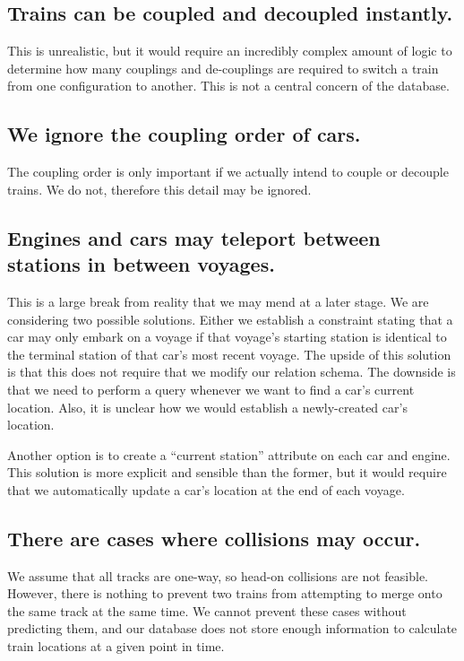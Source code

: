 \documentclass[a4paper]{article}
\begin{document}
\subsection*{Trains can be coupled and decoupled instantly.}
This is unrealistic, but it would require an incredibly complex amount of logic to determine how many couplings and de-couplings are required to switch a train from one configuration to another. This is not a central concern of the database. 

\subsection*{We ignore the coupling order of cars.}
The coupling order is only important if we actually intend to couple or decouple trains. We do not, therefore this detail may be ignored.

\subsection*{Engines and cars may teleport between stations in between voyages.}
This is a large break from reality that we may mend at a later stage. We are considering two possible solutions. Either we establish a constraint stating that a car may only embark on a voyage if that voyage’s starting station is identical to the terminal station of that car’s most recent voyage. The upside of this solution is that this does not require that we modify our relation schema. The downside is that we need to perform a query whenever we want to find a car’s current location. Also, it is unclear how we would establish a newly-created car’s location.

Another option is to create a “current station” attribute on each car and engine. This solution is more explicit and sensible than the former, but it would require that we automatically update a car’s location at the end of each voyage. 

\subsection*{There are cases where collisions may occur.}
	We assume that all tracks are one-way, so head-on collisions are not feasible. However, there is nothing to prevent two trains from attempting to merge onto the same track at the same time. We cannot prevent these cases without predicting them, and our database does not store enough information to calculate train locations at a given point in time.
\end{document}
